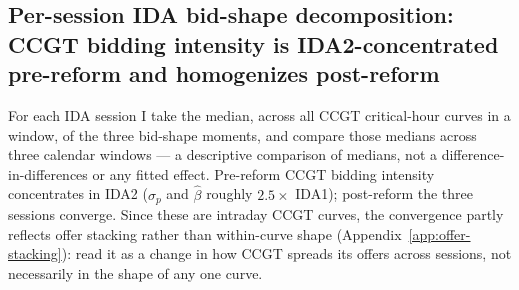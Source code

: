 \documentclass[11pt,a4paper]{article}
\theoremstyle{definition}
\theoremstyle{remark}
\theoremstyle{plain}
\begin{document}
\subsection{Per-session IDA bid-shape decomposition: CCGT bidding intensity is IDA2-concentrated pre-reform and homogenizes post-reform}\label{sec:5-per-session-ida}

For each IDA session I take the median, across all CCGT critical-hour curves in a window, of the three bid-shape moments, and compare those medians across three calendar windows --- a descriptive comparison of medians, not a difference-in-differences or any fitted effect. Pre-reform CCGT bidding intensity concentrates in IDA2 ($\sigma_p$ and $\hat\beta$ roughly $2.5\times$ IDA1); post-reform the three sessions converge. Since these are intraday CCGT curves, the convergence partly reflects offer stacking rather than within-curve shape (Appendix~\ref{app:offer-stacking}): read it as a change in how CCGT spreads its offers across sessions, not necessarily in the shape of any one curve.

\begin{center}
\footnotesize
\setlength{\tabcolsep}{6pt}
\label{tab:per-session-ida-bidshape}
\end{center}
\end{document}
